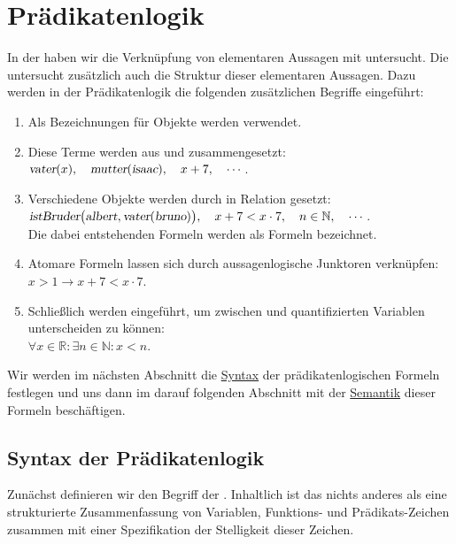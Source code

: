 \chapter{Prädikatenlogik}
In der  haben wir die Verknüpfung von elementaren Aussagen mit  untersucht.
Die  untersucht zusätzlich auch die Struktur dieser elementaren Aussagen.  Dazu werden in der
Prädikatenlogik die folgenden zusätzlichen Begriffe eingeführt:
\begin{enumerate}
\item Als Bezeichnungen für Objekte werden  verwendet.
\item Diese Terme werden aus  und 
      zusammengesetzt: 
      \\[0.2cm]
      \hspace*{1.3cm}
      $\textsl{vater}(x),\quad \textsl{mutter}(\textsl{isaac}), \quad x+7, \quad \cdots$.
\item Verschiedene Objekte werden durch  in Relation gesetzt:
      \\[0.2cm]
      \hspace*{1.3cm}
      $\textsl{istBruder}\bigl(\textsl{albert}, \textsl{vater}(\textsl{bruno})\bigr),\quad x+7 < x\cdot 7,\quad n \in \mathbb{N}, \quad \cdots$.
      \\[0.2cm]
      Die dabei entstehenden Formeln werden als  Formeln bezeichnet.
\item Atomare Formeln lassen sich durch aussagenlogische Junktoren verknüpfen:
      \\[0.2cm]
      \hspace*{1.3cm}
      $x > 1 \rightarrow x + 7 < x \cdot  7$.
\item Schließlich werden  eingeführt, um zwischen  und
       quantifizierten Variablen unterscheiden
      zu können:
      \\[0.2cm]
      \hspace*{1.3cm}
      $\forall x \in \mathbb{R}: \exists n \in \mathbb{N}: x < n$.
\end{enumerate}
Wir werden im nächsten Abschnitt die \href{https://de.wikipedia.org/wiki/Syntax}{Syntax} der
prädikatenlogischen Formeln festlegen und uns dann im darauf folgenden Abschnitt mit der 
\href{https://de.wikipedia.org/wiki/Semantik}{Semantik} dieser Formeln beschäftigen.

\section{Syntax der Prädikatenlogik}
Zunächst definieren wir den Begriff der .  Inhaltlich ist das nichts anderes als eine 
strukturierte Zusammenfassung von Variablen, Funktions- und Prädikats-Zeichen zusammen mit
einer Spezifikation der Stelligkeit dieser Zeichen.
 
